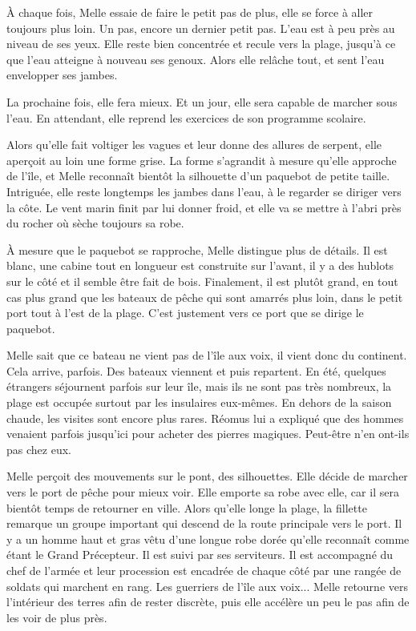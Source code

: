 À chaque fois, Melle essaie de faire le petit pas de plus, elle se force à aller toujours plus loin. Un pas, encore un dernier petit pas. L'eau est à peu près au niveau de ses yeux. Elle reste bien concentrée et recule vers la plage, jusqu'à ce que l'eau atteigne à nouveau ses genoux. Alors elle relâche tout, et sent l'eau envelopper ses jambes.

La prochaine fois, elle fera mieux. Et un jour, elle sera capable de marcher sous l'eau. En attendant, elle reprend les exercices de son programme scolaire.

Alors qu'elle fait voltiger les vagues et leur donne des allures de serpent, elle aperçoit au loin une forme grise. La forme s'agrandit à mesure qu'elle approche de l'île, et Melle reconnaît bientôt la silhouette d'un paquebot de petite taille. Intriguée, elle reste longtemps les jambes dans l'eau, à le regarder se diriger vers la côte. Le vent marin finit par lui donner froid, et elle va se mettre à l'abri près du rocher où sèche toujours sa robe.

À mesure que le paquebot se rapproche, Melle distingue plus de détails. Il est blanc, une cabine tout en longueur est construite sur l'avant, il y a des hublots sur le côté et il semble être fait de bois. Finalement, il est plutôt grand, en tout cas plus grand que les bateaux de pêche qui sont amarrés plus loin, dans le petit port tout à l'est de la plage. C'est justement vers ce port que se dirige le paquebot.

Melle sait que ce bateau ne vient pas de l'île aux voix, il vient donc du continent. Cela arrive, parfois. Des bateaux viennent et puis repartent. En été, quelques étrangers séjournent parfois sur leur île, mais ils ne sont pas très nombreux, la plage est occupée surtout par les insulaires eux-mêmes. En dehors de la saison chaude, les visites sont encore plus rares. Réomus lui a expliqué que des hommes venaient parfois jusqu'ici pour acheter des pierres magiques. Peut-être n'en ont-ils pas chez eux.

Melle perçoit des mouvements sur le pont, des silhouettes. Elle décide de marcher vers le port de pêche pour mieux voir. Elle emporte sa robe avec elle, car il sera bientôt temps de retourner en ville. Alors qu'elle longe la plage, la fillette remarque un groupe important qui descend de la route principale vers le port. Il y a un homme haut et gras vêtu d'une longue robe dorée qu'elle reconnaît comme étant le Grand Précepteur. Il est suivi par ses serviteurs. Il est accompagné du chef de l'armée et leur procession est encadrée de chaque côté par une rangée de soldats qui marchent en rang. Les guerriers de l'île aux voix... Melle retourne vers l'intérieur des terres afin de rester discrète, puis elle accélère un peu le pas afin de les voir de plus près.


